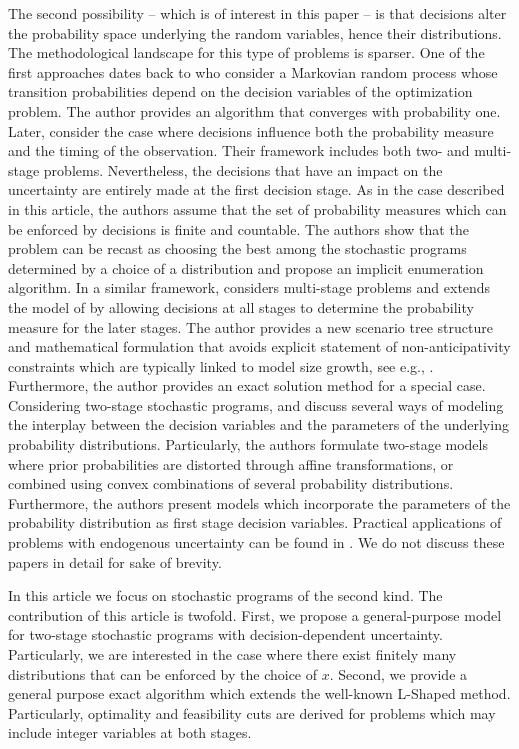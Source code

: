 \documentclass[12pt]{article}
\theoremstyle{thmstylethree}%
\begin{document}
The second possibility -- which is of interest in this paper -- is that decisions alter the probability space underlying the random variables, hence their distributions. 
The methodological landscape for this type of problems is sparser. 
One of the first approaches dates back to \cite{Pfl90} who consider a Markovian random process whose transition probabilities depend on the decision variables of the optimization problem. The author provides an algorithm that converges with probability one. 
Later, \cite{JonWW98} consider the case where decisions influence both the probability measure and the timing of the observation. 
Their framework includes both two- and multi-stage problems. Nevertheless, the decisions that have an impact on the uncertainty are entirely made at the first decision stage. As in the case described in this article, the authors assume that the set of probability measures which can be enforced by decisions is finite and countable. The authors show that the problem can be recast as choosing the best among the stochastic programs determined by a choice of a distribution and propose an implicit enumeration algorithm.
In a similar framework, \cite{Pan21} considers multi-stage problems and extends the model of \cite{JonWW98} by allowing decisions at all stages to determine the probability measure for the later stages. The author provides a new scenario tree structure and mathematical formulation that avoids explicit statement of non-anticipativity constraints which are typically linked to model size growth, see e.g., \cite{ApaG16,HooM16,MooM18}. 
Furthermore, the author provides an exact solution method for a special case.
Considering two-stage stochastic programs, \cite{Hel16} and \cite{HelBT18} discuss several ways of modeling the interplay between the decision variables and the parameters of the underlying probability distributions. Particularly, the authors formulate two-stage models where prior probabilities are distorted through affine transformations, or combined using convex combinations of several probability distributions.
Furthermore, the authors present models which incorporate the parameters of the probability distribution as first stage decision variables.  Practical applications of problems with endogenous uncertainty can be found in \cite{Ahm00,VisSF04,Fla10,PeeSGV10,LauPK14,HelW05,TonFR12,EscGMU18,hewittpantusoJOC,lejeune2024profit}. We do not discuss these papers in detail for sake of brevity.  

In this article we focus on stochastic programs of the second kind. 
The contribution of this article is twofold. First, we propose a general-purpose model for two-stage stochastic programs with decision-dependent uncertainty. Particularly, we are interested in the case where there exist finitely many distributions that can be enforced by the choice of $x$. 
Second, we provide a general purpose exact algorithm which extends the well-known L-Shaped method. Particularly, optimality and feasibility cuts are derived for problems which may include integer variables at both stages. 
\end{document}
